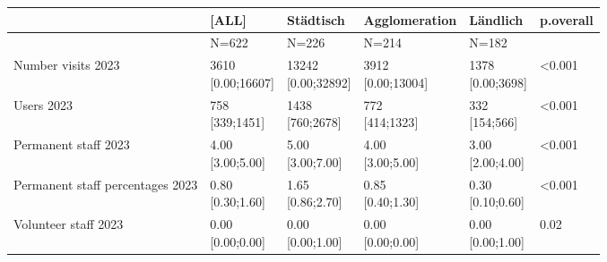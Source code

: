 \documentclass[a4paper,
fontsize=11pt,
oneside,
numbers=noperiodatend,
parskip=half-,
bibliography=totoc,
final
]{scrartcl}
\begin{document}
\begin{landscape}
\begin{table}[]\centering
\begin{tabular}{|l|l|l|l|l|l|}
\hline
                                 & \textbf{{[}ALL{]}}       & \textbf{Städtisch}        & \textbf{Agglomeration}   & \textbf{Ländlich}      & \textbf{p.overall} \\ \hline
                                 & N=622                    & N=226                     & N=214                    & N=182                  &                    \\ \hline
Number visits 2023               & \makecell{ 3610 \\ {[}0.00;16607{]}}    & \makecell{ 13242 \\ {[}0.00;32892{]}}    & \makecell{ 3912 \\ {[}0.00;13004{]}}    & \makecell{ 1378 \\ {[}0.00;3698{]}}   & \textless{}0.001   \\ \hline
Users 2023                       & \makecell{ 758 \\ {[}339;1451{]}}       & \makecell{ 1438 \\ {[}760;2678{]}}       & \makecell{ 772 \\ {[}414;1323{]}}       & \makecell{ 332 \\ {[}154;566{]}}      & \textless{}0.001   \\ \hline
Permanent staff 2023             & \makecell{ 4.00 \\ {[}3.00;5.00{]}}     & \makecell{ 5.00 \\ {[}3.00;7.00{]}}      & \makecell{ 4.00 \\ {[}3.00;5.00{]}}     & \makecell{ 3.00 \\ {[}2.00;4.00{]}}   & \textless{}0.001   \\ \hline
Permanent staff percentages 2023 & \makecell{ 0.80 \\ {[}0.30;1.60{]}}     & \makecell{ 1.65 \\ {[}0.86;2.70{]}}      & \makecell{ 0.85 \\ {[}0.40;1.30{]}}     & \makecell{ 0.30 \\ {[}0.10;0.60{]}}   & \textless{}0.001   \\ \hline
Volunteer staff 2023             & \makecell{ 0.00 \\ {[}0.00;0.00{]}}     & \makecell{ 0.00 \\ {[}0.00;1.00{]}}      & \makecell{ 0.00 \\ {[}0.00;0.00{]}}     & \makecell{ 0.00 \\ {[}0.00;1.00{]}}   & 0.02               \\ \hline

\end{tabular}
\end{table}
\end{landscape}
\end{document}
